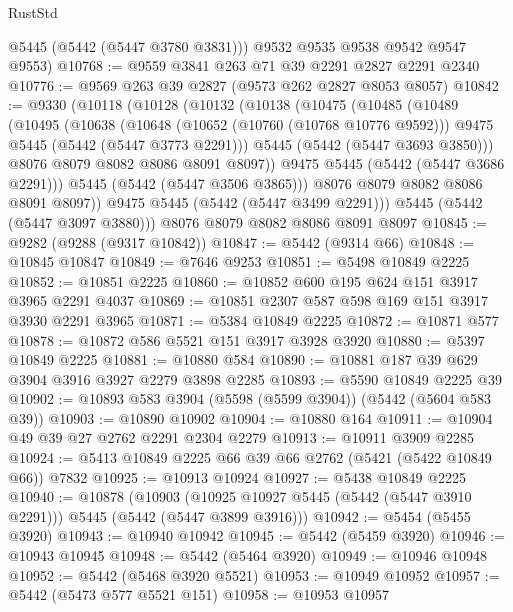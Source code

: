\begin{lexlean}{RustStd}
\begin{coremodule}
        @5445
        (@5442 (@5447 @3780 @3831)))
      @9532
      @9535
      @9538
      @9542
      @9547
      @9553)
@10768 := @9559 @3841 @263 @71 @39 @2291 @2827 @2291 @2340
@10776 := @9569 @263 @39 @2827 (@9573 @262 @2827 @8053 @8057)
@10842 := @9330
    (@10118
      (@10128
        (@10132
          (@10138
            (@10475
              (@10485
                (@10489
                  (@10495
                    (@10638
                      (@10648
                        (@10652 (@10760 (@10768 @10776 @9592)))
                        @9475
                        @5445
                        (@5442 (@5447 @3773 @2291)))
                      @5445
                      (@5442 (@5447 @3693 @3850)))
                    @8076
                    @8079
                    @8082
                    @8086
                    @8091
                    @8097))
                @9475
                @5445
                (@5442 (@5447 @3686 @2291)))
              @5445
              (@5442 (@5447 @3506 @3865)))
            @8076
            @8079
            @8082
            @8086
            @8091
            @8097))
        @9475
        @5445
        (@5442 (@5447 @3499 @2291)))
      @5445
      (@5442 (@5447 @3097 @3880)))
    @8076
    @8079
    @8082
    @8086
    @8091
    @8097
@10845 := @9282 (@9288 (@9317 @10842))
@10847 := @5442 (@9314 @66)
@10848 := @10845 @10847
@10849 := @7646 @9253
@10851 := @5498 @10849 @2225
@10852 := @10851 @2225
@10860 := @10852 @600 @195 @624 @151 @3917 @3965 @2291 @4037
@10869 := @10851 @2307 @587 @598 @169 @151 @3917 @3930 @2291 @3965
@10871 := @5384 @10849 @2225
@10872 := @10871 @577
@10878 := @10872 @586 @5521 @151 @3917 @3928 @3920
@10880 := @5397 @10849 @2225
@10881 := @10880 @584
@10890 := @10881 @187 @39 @629 @3904 @3916 @3927 @2279 @3898 @2285
@10893 := @5590 @10849 @2225 @39
@10902 := @10893 @583 @3904 (@5598 (@5599 @3904)) (@5442 (@5604 @583 @39))
@10903 := @10890 @10902
@10904 := @10880 @164
@10911 := @10904 @49 @39 @27 @2762 @2291 @2304 @2279
@10913 := @10911 @3909 @2285
@10924 := @5413 @10849 @2225 @66 @39 @66 @2762 (@5421 (@5422 @10849 @66)) @7832
@10925 := @10913 @10924
@10927 := @5438 @10849 @2225
@10940 := @10878
    (@10903 (@10925 @10927 @5445 (@5442 (@5447 @3910 @2291))) @5445 (@5442 (@5447 @3899 @3916)))
@10942 := @5454 (@5455 @3920)
@10943 := @10940 @10942
@10945 := @5442 (@5459 @3920)
@10946 := @10943 @10945
@10948 := @5442 (@5464 @3920)
@10949 := @10946 @10948
@10952 := @5442 (@5468 @3920 @5521)
@10953 := @10949 @10952
@10957 := @5442 (@5473 @577 @5521 @151)
@10958 := @10953 @10957

\end{coremodule}
\end{lexlean}
